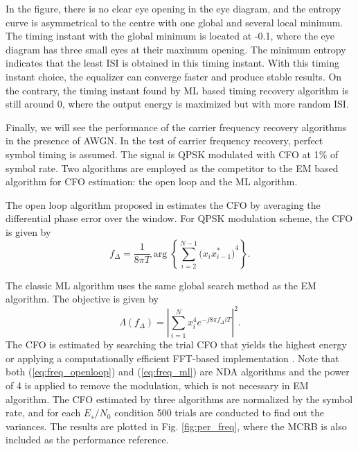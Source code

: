 \documentclass[journal,comsoc]{IEEEtran}
\begin{document}
In the figure, there is no clear eye opening in the eye diagram, and the entropy curve is asymmetrical to the centre with one global and several local minimum. 
The timing instant with the global minimum is located at -0.1, where the eye diagram has three small eyes at their maximum opening.
The minimum entropy indicates that the least ISI is obtained in this timing instant.
With this timing instant choice, the equalizer can converge faster and produce stable results.
On the contrary, the timing instant found by ML based timing recovery algorithm is still around 0, 
where the output energy is maximized but with more random ISI.

Finally, we will see the performance of the carrier frequency recovery algorithms in the presence of AWGN.
In the test of carrier frequency recovery, perfect symbol timing is assumed.
The signal is QPSK modulated with CFO at 1\% of symbol rate.
Two algorithms are employed as the competitor to the EM based algorithm for CFO estimation:
the open loop and the ML algorithm.

The open loop algorithm proposed in \cite{Chuang1991} estimates the CFO  by averaging the differential phase error over the window.
For QPSK modulation scheme, the CFO is given by \cite{mengali1997synchronization}
\begin{equation}
f_\Delta = \frac{1}{8 \pi T} \arg \left\{ {\sum\limits_{i = 2}^{{N} - 1} {{{\big( {x_i x^*_{i-1}} \big)}^4}} } \right\}.
\label{eq:freq_openloop}
\end{equation}

The classic ML algorithm uses the same global search method as the EM algorithm.
The objective is given by 
\begin{equation}
\Lambda (f_\Delta)=\left| \sum\limits_{i = 1}^N {{{ {{x^4_i}e^{-j8\pi f_\Delta i T}}}}} \right|^2. 
\label{eq:freq_ml}
\end{equation}
The CFO is estimated by searching the trial CFO that yields the highest energy or applying a computationally efficient FFT-based implementation \cite{Wang2004}.
Note that both (\ref{eq:freq_openloop}) and (\ref{eq:freq_ml}) are NDA algorithms and the power of 4 is applied to remove the modulation, which is not necessary in EM algorithm.
The CFO estimated by three algorithms are normalized by the symbol rate,
and for each \(E_s/N_0\) condition 500 trials are conducted to find out the variances.
The results are plotted in Fig. \ref{fig:per_freq}, where the MCRB is also included as the performance reference.
\end{document}
